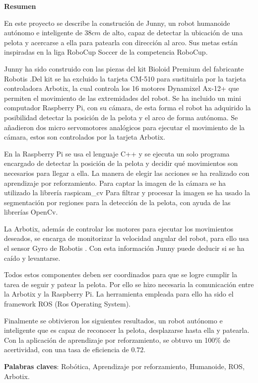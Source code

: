 \setcounter{page}{4}
\begin{center}
	{\bf Resumen}  %
\end{center}	


En este proyecto se describe la construción de Junny, un robot humanoide autónomo e inteligente de $38 cm $ de alto, capaz de detectar la ubicación de una pelota y acercarse a ella para patearla con dirección al arco. Sus metas están inspiradas en la liga RoboCup Soccer de la competencia RoboCup.

Junny ha sido construido con las piezas del kit Bioloid Premium del fabricante Robotis %
.Del kit se ha excluido la tarjeta CM-510 para sustituirla por la tarjeta controladora Arbotix, la cual controla los 16 motores Dynamixel Ax-12+ que permiten el movimiento de las extremidades del robot. Se ha incluido un mini computador Raspberry Pi, con su cámara, %
de esta forma el robot ha adquirido la posibilidad detectar la posición de la pelota y el arco de forma autónoma. Se añadieron dos micro servomotores analógicos para ejecutar el movimiento de la c\'amara, estos son controlados por la tarjeta Arbotix. 

En la Raspberry Pi se usa el lenguaje C++ y se ejecuta un solo programa encargado de detectar la posición de la pelota y decidir qué movimientos son necesarios para llegar a ella. La manera de elegir las acciones se ha realizado con aprendizaje por reforzamiento. Para captar la imagen de la cámara se ha utilizado la librería raspicam\_cv %
 Para filtrar y procesar la imagen se ha usado la segmentaci\'on por regiones para la detecci\'on de la pelota, con ayuda de las librerías OpenCv. %

La Arbotix, además de controlar los motores para ejecutar los movimientos deseados, se encarga de monitorizar la velocidad angular del robot, para ello usa el sensor Gyro de Robotis %
. Con esta información Junny puede deducir si se ha caído y levantarse. 

Todos estos componentes deben ser coordinados para que se logre cumplir la tarea de seguir y patear la pelota. Por ello se hizo necesaria la comunicación entre la Arbotix y la Raspberry Pi. La herramienta 
empleada para ello ha sido el \gls{framework} ROS (Ros Operating System). %

Finalmente se obtivieron los siguientes resultados, un robot aut\'onomo e inteligente que es capaz de reconocer la pelota, desplazarse hasta ella y patearla. Con la aplicaci\'on de aprendizaje por reforzamiento, se obtuvo un 100\% de acertividad, con una tasa de eficiencia de $0.72$.

\textbf{Palabras claves}: Rob\'otica, Aprendizaje por reforzamiento, Humanoide, ROS, Arbotix.


